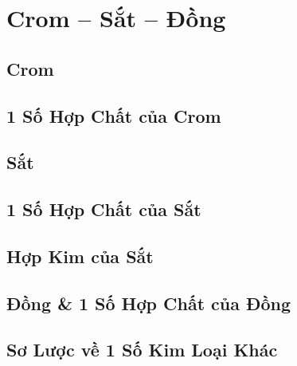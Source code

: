 \documentclass{article}
\numberwithin{equation}{section}
\begin{document}

\section{Crom -- Sắt -- Đồng}

\subsection{Crom}


\subsection{1 Số Hợp Chất của Crom}


\subsection{Sắt}


\subsection{1 Số Hợp Chất của Sắt}


\subsection{Hợp Kim của Sắt}


\subsection{Đồng \& 1 Số Hợp Chất của Đồng}


\subsection{Sơ Lược về 1 Số Kim Loại Khác}
\end{document}
